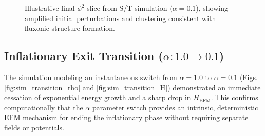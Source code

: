 \documentclass[11pt]{article}
\begin{document}
\begin{figure}[htbp] %
    \centering
     \caption{Illustrative final \(\phi^2\) slice from S/T simulation (\(\alpha=0.1\)), showing amplified initial perturbations and clustering consistent with fluxonic structure formation.}
    \label{fig:sim_structure_tikz_fmt}
\end{figure}

\subsection{Inflationary Exit Transition (\(\alpha: 1.0 \to 0.1\))}
The simulation modeling an instantaneous switch from \(\alpha=1.0\) to \(\alpha=0.1\) (Figs. \ref{fig:sim_transition_rho} and \ref{fig:sim_transition_H}) demonstrated an immediate cessation of exponential energy growth and a sharp drop in \(H_{\text{EFM}}\). This confirms computationally that the \(\alpha\) parameter switch provides an intrinsic, deterministic EFM mechanism for ending the inflationary phase without requiring separate fields or potentials.
\end{document}
